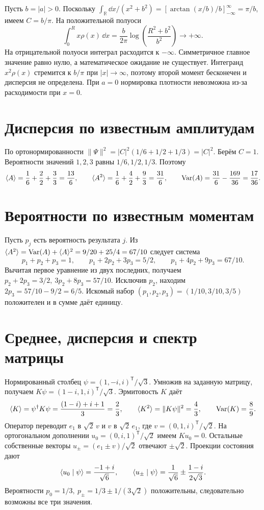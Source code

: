 \documentclass[11pt,a4paper]{article}
\begin{document}
Пусть \(b=|a|>0\). Поскольку
\(\int_\mathbb R \dd x/(x^2+b^2)=[\arctan(x/b)/b]_{-\infty}^{\infty}
=\pi/b\), имеем \(C=b/\pi\).
На положительной полуоси
\[
 \int_0^R x\rho(x)\,\dd x=\frac{b}{2\pi}
                 \log\!\left(\frac{R^2+b^2}{b^2}\right)\longrightarrow +\infty.
\]
На отрицательной полуоси интеграл расходится к \(-\infty\).
Симметричное главное значение равно нулю, а математическое ожидание
не существует. Интегранд \(x^2\rho(x)\) стремится к \(b/\pi\) при
\(|x|\to\infty\), поэтому второй момент бесконечен и дисперсия не
определена. При \(a=0\) нормировка плотности невозможна из-за
расходимости при \(x=0\).

\section{Дисперсия по известным амплитудам}

По ортонормированности \(\|\Psi\|^2=|C|^2(1/6+1/2+1/3)=|C|^2\).
Берём \(C=1\). Вероятности значений \(1,2,3\) равны \(1/6,1/2,1/3\).
Поэтому
\[
 \langle A\rangle=\frac16+\frac22+\frac33=\frac{13}{6},\qquad
 \langle A^2\rangle=\frac16+\frac42+\frac93=\frac{31}{6},\qquad
 \operatorname{Var}(A)=\frac{31}{6}-\frac{169}{36}=\frac{17}{36}.
\]

\section{Вероятности по известным моментам}

Пусть \(p_j\) есть вероятность результата \(j\). Из
\(\langle A^2\rangle=\operatorname{Var}(A)+\langle A\rangle^2=9/20+25/4=67/10\) следует система
\[
 p_1+p_2+p_3=1,\qquad p_1+2p_2+3p_3=5/2,\qquad
 p_1+4p_2+9p_3=67/10.
\]
Вычитая первое уравнение из двух последних, получаем
\(p_2+2p_3=3/2,\ 3p_2+8p_3=57/10\).
Исключив \(p_2\), находим \(2p_3=57/10-9/2=6/5\).
Искомый набор \((p_1,p_2,p_3)=(1/10,3/10,3/5)\) положителен
и в сумме даёт единицу.

\section{Среднее, дисперсия и спектр матрицы}

Нормированный столбец \(\psi=(1,-i,i)^{\mathsf T}/\sqrt3\).
Умножив на заданную матрицу, получаем
\(K\psi=(1-i,1,i)^{\mathsf T}/\sqrt3\). Эрмитовость \(K\) даёт
\[
 \langle K\rangle=\psi^\dagger K\psi=\frac{(1-i)+i+1}{3}=\frac23,\qquad
 \langle K^2\rangle=\|K\psi\|^2=\frac43,\qquad \operatorname{Var}(K)=\frac89.
\]
Оператор переводит \(e_1\) в \(\sqrt2\,v\) и \(v\) в \(\sqrt2\,e_1\),
где \(v=(0,1,i)^{\mathsf T}/\sqrt2\). На ортогональном дополнении
\(u_0=(0,i,1)^{\mathsf T}/\sqrt2\) имеем \(Ku_0=0\).
Остальные собственные векторы \(u_\pm=(e_1\pm v)/\sqrt2\)
отвечают \(\pm\sqrt2\). Проекции состояния дают
\[
 \langle u_0\mid \psi\rangle=\frac{-1+i}{\sqrt6},\qquad
 \langle u_\pm\mid \psi\rangle=\frac{1}{\sqrt6}
                     \pm \frac{1-i}{2\sqrt3}.
\]
Вероятности \(p_0=1/3,\ p_\pm=1/3\pm 1/(3\sqrt2)\) положительны,
следовательно возможны все три значения.
\end{document}
